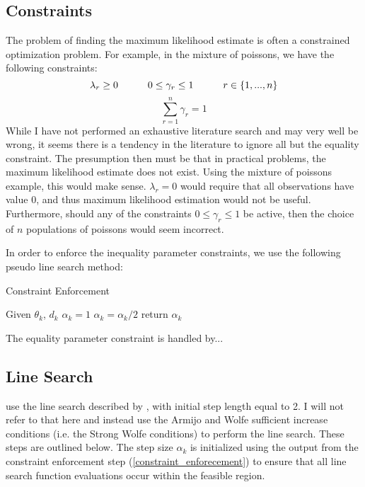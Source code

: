\documentclass[letter,12pt]{article}
\begin{document}
\subsection{Constraints}
The problem of finding the maximum likelihood estimate is often a constrained optimization problem.  For example, in the mixture of poissons, we have the following constraints:
\[
\lambda_r \geq 0 \indent \indent
0 \leq \gamma_r \leq 1 \indent \indent
r \in \{1,...,n\}
\]
\[
\sum_{r=1}^{n} \gamma_r = 1
\]
While I have not performed an exhaustive literature search and may very well be wrong, it seems there is a tendency in the literature to ignore all but the equality constraint.  The presumption then must be that in practical problems, the maximum likelihood estimate does not exist.  Using the mixture of poissons example, this would make sense.  $\lambda_r=0$ would require that all observations have value $0$, and thus maximum likelihood estimation would not be useful.  Furthermore, should any of the constraints $0 \leq \gamma_r \leq 1$ be active, then the choice of $n$ populations of poissons would seem incorrect.

In order to enforce the inequality parameter constraints, we use the following pseudo line search method:
 

\begin{algorithm}
\caption{Constraint Enforcement}
\label{constraint_enforecement}
\begin{algorithmic}[1]
\State Given $\theta_k$, $d_k$
\State $\alpha_k = 1$
\State $\alpha_k = \alpha_k / 2$
\EndWhile
\State return $\alpha_k$
\end{algorithmic}
\end{algorithm}

The equality parameter constraint is handled by...

\subsection{Line Search}

\cite{jamshidianj97} use the line search described by \cite{jamshidianj93}, with initial step length equal to 2.  I will not refer to that here and instead use the Armijo and Wolfe sufficient increase conditions (i.e. the Strong Wolfe conditions) to perform the line search.  These steps are outlined below.  The step size $\alpha_k$ is initialized using the output from the constraint enforcement step (\ref{constraint_enforecement}) to ensure that all line search function evaluations occur within the feasible region.
\end{document}
